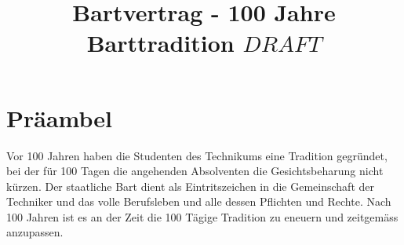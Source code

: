 \documentclass[fontsize=12pt,parskip=half]{scrartcl}
\begin{document}
\title{Bartvertrag - 100 Jahre Barttradition \(DRAFT\)}
\maketitle


\section*{Präambel}
Vor 100 Jahren haben die Studenten des Technikums eine Tradition gegründet, bei der für 100 Tagen die angehenden Absolventen die Gesichtsbeharung nicht kürzen.
Der staatliche Bart dient als Eintritszeichen in die Gemeinschaft der Techniker und das volle Berufsleben und alle dessen Pflichten und Rechte.
Nach 100 Jahren ist es an der Zeit die 100 Tägige Tradition zu eneuern und zeitgemäss anzupassen.

\appendix %
\end{document}
